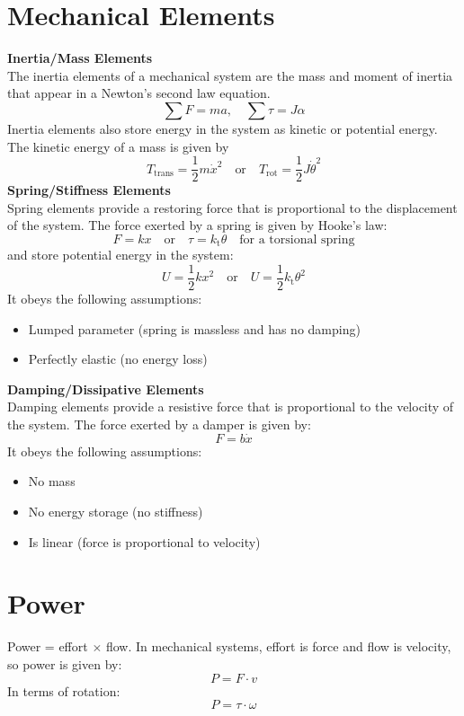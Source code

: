 \documentclass[12pt]{article}
\begin{document}
\section*{Mechanical Elements}
\textbf{Inertia/Mass Elements}\\
The inertia elements of a mechanical system are the mass and moment of inertia that appear in a Newton's second law equation.
\[\sum F = ma, \quad \sum \tau = J\alpha\]
Inertia elements also store energy in the system as kinetic or potential energy. The kinetic energy of a mass is given by
\[T_{\text{trans}} = \frac{1}{2}m\dot{x}^2 \quad \text{or} \quad T_{\text{rot}} = \frac{1}{2}J\dot{\theta}^2\]
\textbf{Spring/Stiffness Elements}\\
Spring elements provide a restoring force that is proportional to the displacement of the system. The force exerted by a spring is given by Hooke's law:
\[F = kx \quad \text{or} \quad \tau = k_\text{t}\theta \quad \text{for a torsional spring}\]
and store potential energy in the system:
\[U = \frac{1}{2}kx^2 \quad \text{or} \quad U = \frac{1}{2}k_\text{t}\theta^2\]
It obeys the following assumptions:
\begin{itemize}
    \item Lumped parameter (spring is massless and has no damping)
    \item Perfectly elastic (no energy loss)
\end{itemize}
\textbf{Damping/Dissipative Elements}\\
Damping elements provide a resistive force that is proportional to the velocity of the system. The force exerted by a damper is given by:
\[F = b\dot{x}\]
It obeys the following assumptions:
\begin{itemize}
    \item No mass
    \item No energy storage (no stiffness)
    \item Is linear (force is proportional to velocity)
\end{itemize}
\section*{Power}
Power = effort $\times$ flow. In mechanical systems, effort is force and flow is velocity, so power is given by:
\[P = F \cdot v\]
In terms of rotation:
\[P = \tau \cdot \omega\]
\end{document}
